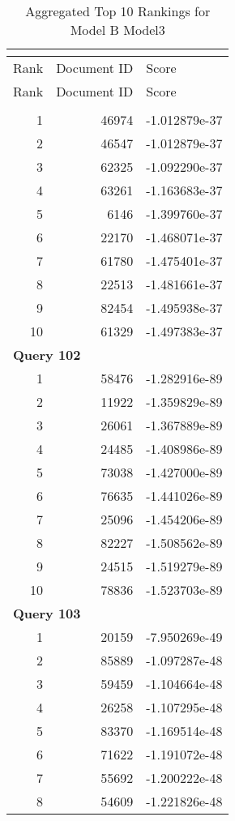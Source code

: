 \begin{longtable}[{p}]{@{}rrp{}@{}}
\caption{Aggregated Top 10 Rankings for Model B Model3} {\label{tab:aggregated_BModel3}}\\
\toprule
Rank & Document ID & Score \\
\midrule
\endfirsthead
\toprule
Rank & Document ID & Score \\
\midrule
\endhead
\endfoot
\bottomrule
\endlastfoot
\multicolumn{3}{l}{\bfseries Query 101} \\
1 & 46974 & -1.012879e-37 \\
2 & 46547 & -1.012879e-37 \\
3 & 62325 & -1.092290e-37 \\
4 & 63261 & -1.163683e-37 \\
5 & 6146 & -1.399760e-37 \\
6 & 22170 & -1.468071e-37 \\
7 & 61780 & -1.475401e-37 \\
8 & 22513 & -1.481661e-37 \\
9 & 82454 & -1.495938e-37 \\
10 & 61329 & -1.497383e-37 \\
\midrule
\multicolumn{3}{l}{\bfseries Query 102} \\
1 & 58476 & -1.282916e-89 \\
2 & 11922 & -1.359829e-89 \\
3 & 26061 & -1.367889e-89 \\
4 & 24485 & -1.408986e-89 \\
5 & 73038 & -1.427000e-89 \\
6 & 76635 & -1.441026e-89 \\
7 & 25096 & -1.454206e-89 \\
8 & 82227 & -1.508562e-89 \\
9 & 24515 & -1.519279e-89 \\
10 & 78836 & -1.523703e-89 \\
\midrule
\multicolumn{3}{l}{\bfseries Query 103} \\
1 & 20159 & -7.950269e-49 \\
2 & 85889 & -1.097287e-48 \\
3 & 59459 & -1.104664e-48 \\
4 & 26258 & -1.107295e-48 \\
5 & 83370 & -1.169514e-48 \\
6 & 71622 & -1.191072e-48 \\
7 & 55692 & -1.200222e-48 \\
8 & 54609 & -1.221826e-48 \\

\end{longtable}
